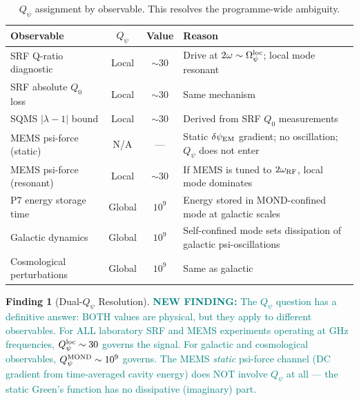 \documentclass[11pt]{article}
\newcommand{\Opsi}{\Omega_\psi}
\newcommand{\dpsiEM}{\delta\psi_{\rm EM}}
\newcommand{\newfinding}[1]{\textcolor{teal}{\textbf{NEW FINDING:} #1}}
\theoremstyle{definition}
\newtheorem{finding}[theorem]{Finding}
\theoremstyle{remark}
\begin{document}
\begin{table}[H]
\centering
\caption{$Q_\psi$ assignment by observable. This resolves the
programme-wide ambiguity.}
\label{tab:Q_assignment}
\renewcommand{\arraystretch}{1.3}
\begin{tabular}{@{}p{4.5cm}ccp{5cm}@{}}
\toprule
\textbf{Observable} & \textbf{$Q_\psi$} & \textbf{Value} &
\textbf{Reason} \\
\midrule
\rowcolor{rowhi}
SRF Q-ratio diagnostic & Local & $\sim 30$ & Drive at $2\omega \sim
\Opsi^{\rm loc}$; local mode resonant \\
\rowcolor{rowhi}
SRF absolute $Q_0$ loss & Local & $\sim 30$ & Same mechanism \\
\rowcolor{rowhi}
SQMS $|\lambda-1|$ bound & Local & $\sim 30$ & Derived from SRF
$Q_0$ measurements \\
\rowcolor{rowmed}
MEMS psi-force (static) & N/A & --- & Static $\dpsiEM$ gradient;
no oscillation; $Q_\psi$ does not enter \\
\rowcolor{rowmed}
MEMS psi-force (resonant) & Local & $\sim 30$ & If MEMS is tuned
to $2\omega_{\rm RF}$, local mode dominates \\
\rowcolor{rowlo}
P7 energy storage time & Global & $10^9$ & Energy stored in
MOND-confined mode at galactic scales \\
\rowcolor{rowlo}
Galactic dynamics & Global & $10^9$ & Self-confined mode sets
dissipation of galactic psi-oscillations \\
\rowcolor{rowlo}
Cosmological perturbations & Global & $10^9$ & Same as galactic \\
\bottomrule
\end{tabular}
\end{table}

\begin{finding}[Dual-$Q_\psi$ Resolution]
\label{find:dual_Q}
\newfinding{The $Q_\psi$ question has a definitive answer: BOTH values
are physical, but they apply to different observables. For ALL laboratory
SRF and MEMS experiments operating at GHz frequencies, $Q_\psi^{\rm loc}
\sim 30$ governs the signal. For galactic and cosmological observables,
$Q_\psi^{\rm MOND} \sim 10^9$ governs. The MEMS \emph{static} psi-force
channel (DC gradient from time-averaged cavity energy) does NOT involve
$Q_\psi$ at all --- the static Green's function has no dissipative
(imaginary) part.}
\end{finding}
\end{document}
